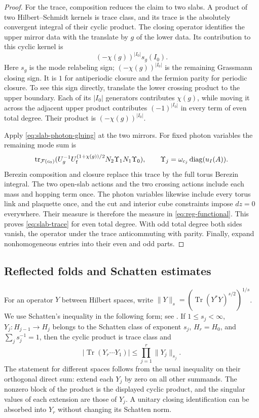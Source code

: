 \begin{proof}
For the trace, composition reduces the claim to two slabs. A product
of two Hilbert--Schmidt kernels is trace class, and its trace is the
absolutely convergent integral of their cyclic product. The closing
operator identifies the upper mirror data with the translate by $g$
of the lower data. Its contribution to this cyclic kernel is
\[
 (-\chi(g))^{|I_0|}s_g(I_0).
\]
Here $s_g$ is the mode relabeling sign; $(-\chi(g))^{|I_0|}$ is the
remaining Grassmann closing sign. It is $1$ for antiperiodic closure
and the fermion parity for periodic closure. To see this sign directly,
translate the lower crossing product to the upper boundary. Each of
its $|I_0|$ generators contributes $\chi(g)$, while moving it across
the adjacent upper product contributes $(-1)^{|I_0|}$ in every term
of even total degree. Their product is $(-\chi(g))^{|I_0|}$.

Apply \eqref{eq:slab-photon-gluing} at the two mirrors. For fixed
photon variables the remaining mode sum is
\[
 \operatorname{tr}_{\mathcal F(c_0)}
    (U_g^{-1}U_{\mathrm f}^{(1+\chi(g))/2}
                       N_2\Upsilon_1N_1\Upsilon_0),
 \qquad \Upsilon_j=\omega_{c_j}\operatorname{diag}(u_I(A)).
\]
Berezin composition and closure replace this trace by the full torus
Berezin integral. The two open-slab actions and the two crossing
actions include each mass and hopping term once. The photon variables
likewise include every torus link and plaquette once, and the cut and
interior cube constraints impose $dz=0$ everywhere. Their measure is
therefore the measure in \eqref{eq:reg-functional}. This proves
\eqref{eq:slab-trace} for even total degree. With odd total degree both
sides vanish, the operator under the trace anticommuting with parity.
Finally, expand nonhomogeneous entries into their even and odd parts.
\end{proof}

\subsection{Reflected folds and Schatten estimates}\label{subsec:slab-folds}

For an operator $Y$ between Hilbert spaces, write
$\|Y\|_s=(\operatorname{Tr}(Y^*Y)^{s/2})^{1/s}$. We use Schatten's
inequality in the following form; see \cite[slides~55--57]{PongeSchatten2025}. If $1\le s_j<\infty$,
$Y_j:H_{j-1}\to H_j$ belongs to the Schatten class of exponent $s_j$,
$H_r=H_0$, and $\sum_js_j^{-1}=1$, then the cyclic product is trace
class and
\begin{equation}\label{eq:slab-schatten-holder}
 |\operatorname{Tr}(Y_r\cdots Y_1)|
                \le\prod_{j=1}^r\|Y_j\|_{s_j}.
\end{equation}
The statement for different spaces follows from the usual inequality
on their orthogonal direct sum: extend each $Y_j$ by zero on all other
summands. The nonzero block of the product is the displayed cyclic
product, and the singular values of each extension are those of $Y_j$.
A unitary closing identification can be absorbed into $Y_r$ without
changing its Schatten norm.

